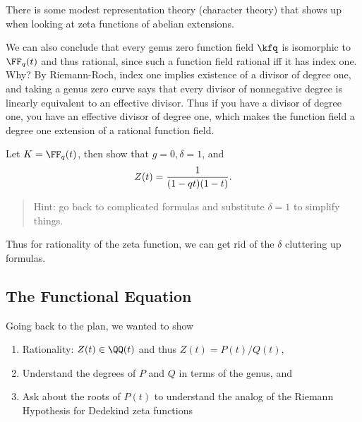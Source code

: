 There is some modest representation theory (character theory) that shows
up when looking at zeta functions of abelian extensions.

\begin{remark}

We can also conclude that every genus zero function field \(\kfq\) is
isomorphic to \(\FF_q(t)\) and thus rational, since such a function
field rational iff it has index one. Why? By Riemann-Roch, index one
implies existence of a divisor of degree one, and taking a genus zero
curve says that every divisor of nonnegative degree is linearly
equivalent to an effective divisor. Thus if you have a divisor of degree
one, you have an effective divisor of degree one, which makes the
function field a degree one extension of a rational function field.

\end{remark}

\begin{exercise}[?]

Let \(K = \FF_q(t)\), then show that \(g=0, \delta = 1\), and
\begin{align*}  
Z(t) = {1 \over (1-qt)(1-t)}
.\end{align*}

\begin{quote}
Hint: go back to complicated formulas and substitute \(\delta=1\) to
simplify things.
\end{quote}

\end{exercise}

Thus for rationality of the zeta function, we can get rid of the
\(\delta\) cluttering up formulas.

\hypertarget{the-functional-equation}{%
\subsection{The Functional Equation}\label{the-functional-equation}}

Going back to the plan, we wanted to show

\begin{enumerate}
\def\labelenumi{\arabic{enumi}.}
\item
  Rationality: \(Z(t) \in \QQ(t)\) and thus \(Z(t) = P(t) / Q(t)\),
\item
  Understand the degrees of \(P\) and \(Q\) in terms of the genus, and
\item
  Ask about the roots of \(P(t)\) to understand the analog of the
  Riemann Hypothesis for Dedekind zeta functions
\end{enumerate}

